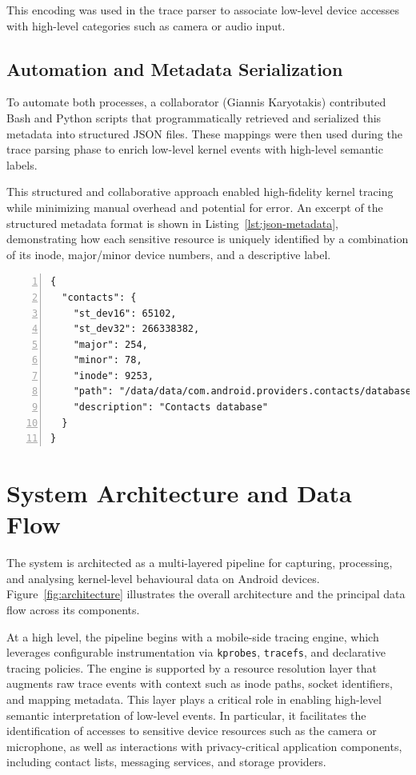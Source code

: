 \documentclass[a4paper,12pt]{report}
\begin{document}
This encoding was used in the trace parser to associate low-level device accesses with high-level categories such as camera or audio input.

\subsection{Automation and Metadata Serialization}

To automate both processes, a collaborator (Giannis Karyotakis) contributed Bash and Python scripts that programmatically retrieved and serialized this metadata into structured JSON files. These mappings were then used during the trace parsing phase to enrich low-level kernel events with high-level semantic labels.

This structured and collaborative approach enabled high-fidelity kernel tracing while minimizing manual overhead and potential for error.
An excerpt of the structured metadata format is shown in Listing~\ref{lst:json-metadata}, demonstrating how each sensitive resource is uniquely identified by a combination of its inode, major/minor device numbers, and a descriptive label.

\begin{lstlisting}[caption={Serialized JSON metadata for sensitive resource mapping},label={lst:json-metadata},numbers=left]
{
  "contacts": {
    "st_dev16": 65102,
    "st_dev32": 266338382,
    "major": 254,
    "minor": 78,
    "inode": 9253,
    "path": "/data/data/com.android.providers.contacts/databases/contacts2.db",
    "description": "Contacts database"
  }
}
\end{lstlisting}

\section{System Architecture and Data Flow}

The system is architected as a multi-layered pipeline for capturing, processing, and analysing kernel-level behavioural data on Android devices. Figure~\ref{fig:architecture} illustrates the overall architecture and the principal data flow across its components.

At a high level, the pipeline begins with a mobile-side tracing engine, which leverages configurable instrumentation via \texttt{kprobes}, \texttt{tracefs}, and declarative tracing policies. The engine is supported by a resource resolution layer that augments raw trace events with context such as inode paths, socket identifiers, and mapping metadata. This layer plays a critical role in enabling high-level semantic interpretation of low-level events. In particular, it facilitates the identification of accesses to sensitive device resources such as the camera or microphone, as well as interactions with privacy-critical application components, including contact lists, messaging services, and storage providers.
\end{document}
